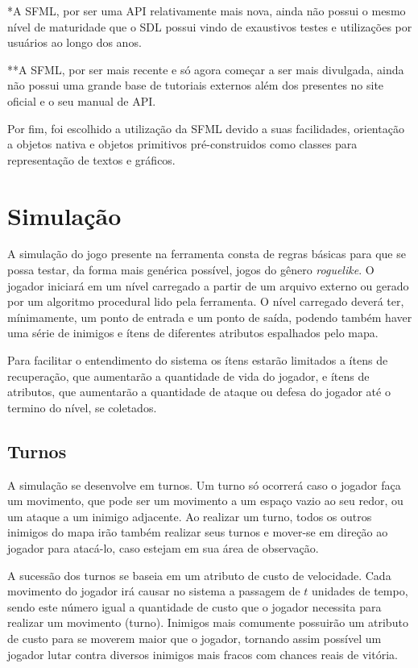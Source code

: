 *A SFML, por ser uma API relativamente mais nova, ainda não possui o mesmo nível de maturidade que o SDL possui vindo de exaustivos testes e utilizações por usuários ao longo dos anos.

**A SFML, por ser mais recente e só agora começar a ser mais divulgada, ainda não possui uma grande base de tutoriais externos além dos presentes no site oficial e o seu manual de API.

Por fim, foi escolhido a utilização da SFML devido a suas facilidades, orientação a objetos nativa e objetos primitivos pré-construidos como classes para representação de textos e gráficos.

\section{Simulação}

A simulação do jogo presente na ferramenta consta de regras básicas para que se possa testar, da forma mais genérica possível, jogos do gênero \textit{roguelike}. O jogador iniciará em um nível carregado a partir de um arquivo externo ou gerado por um algoritmo procedural lido pela ferramenta. O nível carregado deverá ter, mínimamente, um ponto de entrada e um ponto de saída, podendo também haver uma série de inimigos e ítens de diferentes atributos espalhados pelo mapa. 

Para facilitar o entendimento do sistema os ítens estarão limitados a ítens de recuperação, que aumentarão a quantidade de vida do jogador, e ítens de atributos, que aumentarão a quantidade de ataque ou defesa do jogador até o termino do nível, se coletados.

\subsection{Turnos}
A simulação se desenvolve em turnos. Um turno só ocorrerá caso o jogador faça um movimento, que pode ser um movimento a um espaço vazio ao seu redor, ou um ataque a um inimigo adjacente. Ao realizar um turno, todos os outros inimigos do mapa irão também realizar seus turnos e mover-se em direção ao jogador para atacá-lo, caso estejam em sua área de observação. 

A sucessão dos turnos se baseia em um atributo de custo de velocidade. Cada movimento do jogador irá causar no sistema a passagem de $t$ unidades de tempo, sendo este número igual a quantidade de custo que o jogador necessita para realizar um movimento (turno). Inimigos mais comumente possuirão um atributo de custo para se moverem maior que o jogador, tornando assim possível um jogador lutar contra diversos inimigos mais fracos com chances reais de vitória.

